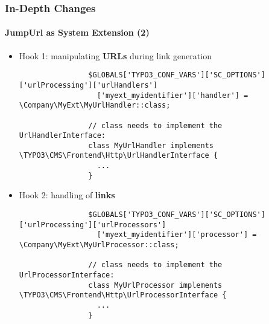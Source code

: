
\begin{frame}[fragile]
	\frametitle{In-Depth Changes}
	\framesubtitle{JumpUrl as System Extension (2)}

	\lstset{basicstyle=\tiny\ttfamily}

	\begin{itemize}

		\item Hook 1: manipulating \textbf{URLs} during link generation

			\begin{lstlisting}
				$GLOBALS['TYPO3_CONF_VARS']['SC_OPTIONS']['urlProcessing']['urlHandlers']
				  ['myext_myidentifier']['handler'] = \Company\MyExt\MyUrlHandler::class;

				// class needs to implement the UrlHandlerInterface:
				class MyUrlHandler implements \TYPO3\CMS\Frontend\Http\UrlHandlerInterface {
				  ...
				}
			\end{lstlisting}

		\item Hook 2: handling of \textbf{links}

			\begin{lstlisting}
				$GLOBALS['TYPO3_CONF_VARS']['SC_OPTIONS']['urlProcessing']['urlProcessors']
				  ['myext_myidentifier']['processor'] = \Company\MyExt\MyUrlProcessor::class;

				// class needs to implement the UrlProcessorInterface:
				class MyUrlProcessor implements \TYPO3\CMS\Frontend\Http\UrlProcessorInterface {
				  ...
				}
			\end{lstlisting}

	\end{itemize}

\end{frame}


